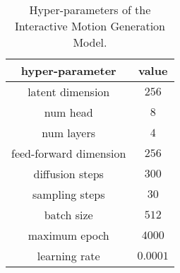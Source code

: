 \begin{table}
    \begin{center}
     \caption{Hyper-parameters of the Interactive Motion Generation Model.}
        \begin{tabular}{cc}
            \toprule
            hyper-parameter & value \\
            \midrule
            latent dimension  & $256$ \\
            num head &$8$ \\
            num layers & $4$ \\
            feed-forward dimension & $256$ \\
            diffusion steps & $300$ \\
            sampling steps & $30$ \\
            batch size & $512$ \\
            maximum epoch & $4000$ \\
            learning rate & $0.0001$ \\
            \bottomrule
        \end{tabular}
    \end{center}
    \label{tab:motion-hyper}
\end{table}